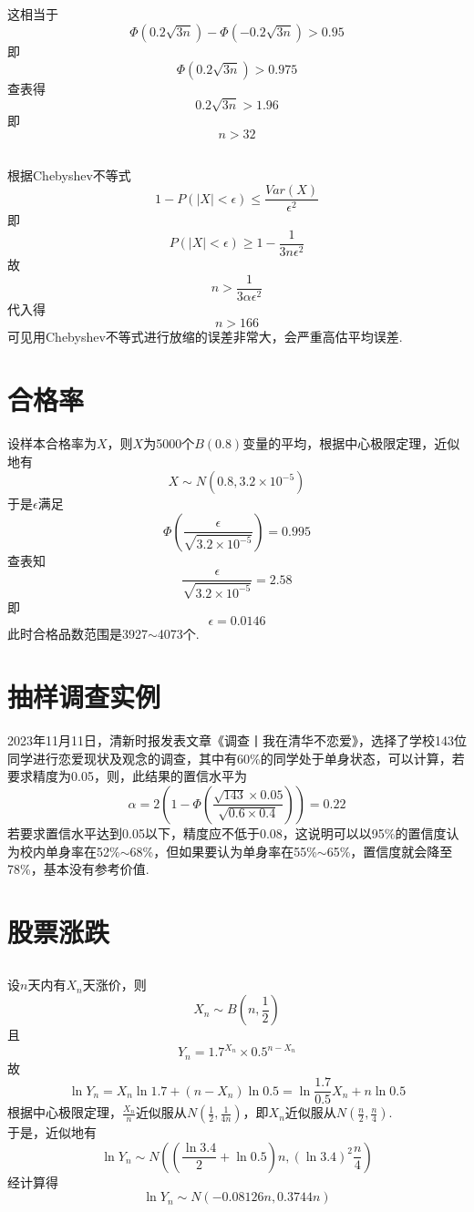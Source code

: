 \documentclass{article}
\begin{document}
\begin{CJK}{UTF8}{gbsn}
\subsection{}
这相当于
$$ \Phi(0.2\sqrt{3n})-\Phi(-0.2\sqrt{3n})>0.95$$
即
$$ \Phi(0.2\sqrt{3n})>0.975$$
查表得
$$ 0.2\sqrt{3n}>1.96$$
即
$$n>32$$
\subsection{}
根据Chebyshev不等式
$$ 1-P(|X|<\epsilon)\leq \frac{Var(X)}{\epsilon^{2}}$$
即
$$ P(|X|<\epsilon)\geq 1-\frac{1}{3n\epsilon^{2}}$$
故
$$ n>\frac{1}{3\alpha\epsilon^{2}}$$
代入得
$$ n>166$$
可见用Chebyshev不等式进行放缩的误差非常大，会严重高估平均误差.
\section{合格率}
设样本合格率为$X$，则$X$为5000个$B(0.8)$变量的平均，根据中心极限定理，近似地有
$$ X\sim N(0.8,3.2\times 10^{-5})$$
于是$\epsilon$满足
$$ \Phi(\frac{\epsilon}{\sqrt{3.2\times 10^{-5}}})=0.995$$
查表知
$$\frac{\epsilon}{\sqrt{3.2\times 10^{-5}}}=2.58$$
即
$$\epsilon=0.0146$$
此时合格品数范围是3927$\sim$4073个.
\section{抽样调查实例}
2023年11月11日，清新时报发表文章《调查丨我在清华不恋爱》，选择了学校143位同学进行恋爱现状及观念的调查，其中有60\%的同学处于单身状态，可以计算，若要求精度为0.05，则，此结果的置信水平为
$$ \alpha=2(1-\Phi(\frac{\sqrt{143}\times 0.05}{\sqrt{0.6\times0.4}}))=0.22$$
若要求置信水平达到0.05以下，精度应不低于0.08，这说明可以以95\%的置信度认为校内单身率在52\%$\sim$68\%，但如果要认为单身率在55\%$\sim$65\%，置信度就会降至78\%，基本没有参考价值.
\section{股票涨跌}
\subsection{}
设$n$天内有$X_{n}$天涨价，则
$$ X_{n}\sim B(n,\frac{1}{2})$$
且
$$ Y_{n}=1.7^{X_{n}}\times 0.5^{n-X_{n}}$$
故
$$ \ln Y_{n}=X_{n}\ln1.7+(n-X_{n})\ln0.5=\ln\frac{1.7}{0.5}X_{n}+n\ln0.5$$
根据中心极限定理，$\frac{X_{n}}{n}$近似服从$N(\frac{1}{2},\frac{1}{4n})$，即$X_{n}$近似服从$N(\frac{n}{2},\frac{n}{4})$.
\\于是，近似地有
$$ \ln Y_{n}\sim N((\frac{\ln3.4}{2}+\ln0.5)n,(\ln3.4)^{2}\frac{n}{4})$$
经计算得
$$ \ln Y_{n}\sim N(-0.08126n,0.3744n)$$

\end{CJK}
\end{document}
